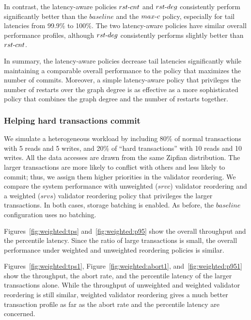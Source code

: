 In contrast, the latency-aware policies $rst\hbox{-}cnt$ and $rst\hbox{-}deg$ consistently perform significantly better than the $baseline$ and the $max\hbox{-}c$ policy, especially for tail latencies from 99.9\% to 100\%. The two latency-aware policies have similar overall performance profiles, although $rst\hbox{-}deg$ consistently performs slightly better than $rst\hbox{-}cnt$.

In summary, the latency-aware policies decrease tail latencies significantly while maintaining a comparable overall performance to the policy that maximizes the number of commits. Moreover, a simple latency-aware policy that privileges the number of restarts over the graph degree is as effective as a more sophisticated policy that combines the graph degree and the number of restarts together.


\subsubsection{Helping hard transactions commit}

We simulate a heterogeneous workload by including 80\% of normal transactions with 5 reads and 5 writes, and 20\% of ``hard transactions'' with 10 reads and 10 writes. All the data accesses are drawn from the same Zipfian distribution. The larger transactions are more likely to conflict with others and less likely to commit; thus, we assign them higher priorities in the validator reordering. We compare the system performance with unweighted ($srvc$) validator reordering and a weighted ($srvs$) validator reordering policy that privileges the larger transactions. In both cases, storage batching is enabled. As before, the $baseline$ configuration uses no batching.

Figures~\ref{fig:weighted:tps} and~\ref{fig:weighted:p95} show the overall throughput and the percentile latency. Since the ratio of large transactions is small, the overall performance under weighted and unweighted reordering policies is similar.

Figures~\ref{fig:weighted:tps1}, Figure~\ref{fig:weighted:abort1},  and~\ref{fig:weighted:p951} show the throughput, the abort rate, and the percentile latency of the larger transactions alone. While the throughput of unweighted and weighted validator reordering is still similar, weighted validator reordering gives a much better transaction profile as far as the abort rate and the percentile latency are concerned.

